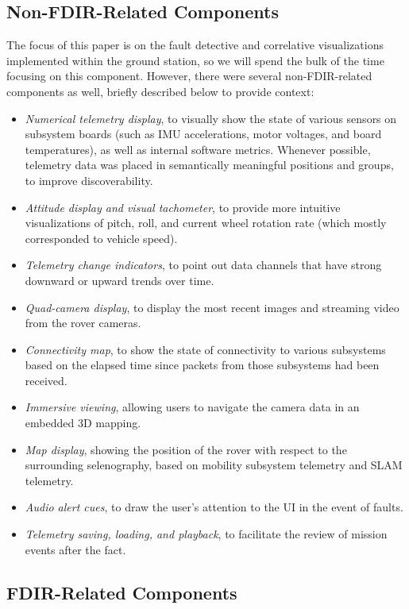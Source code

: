 \subsection{Non-FDIR-Related Components}

The focus of this paper is on the fault detective and correlative visualizations implemented within the ground station, so we will spend the bulk of the time focusing on this component. However, there were several non-FDIR-related components as well, briefly described below to provide context:

\begin{itemize}
    \item \textit{Numerical telemetry display}, to visually show the state of various sensors on subsystem boards (such as IMU accelerations, motor voltages, and board temperatures), as well as internal software metrics. Whenever possible, telemetry data was placed in semantically meaningful positions and groups, to improve discoverability.
    \item \textit{Attitude display and visual tachometer}, to provide more intuitive visualizations of pitch, roll, and current wheel rotation rate (which mostly corresponded to vehicle speed).
    \item \textit{Telemetry change indicators}, to point out data channels that have strong downward or upward trends over time.
    \item \textit{Quad-camera display}, to display the most recent images and streaming video from the rover cameras.
    \item \textit{Connectivity map}, to show the state of connectivity to various subsystems based on the elapsed time since packets from those subsystems had been received.
    \item \textit{Immersive viewing}, allowing users to navigate the camera data in an embedded 3D mapping.
    \item \textit{Map display}, showing the position of the rover with respect to the surrounding selenography, based on mobility subsystem telemetry and SLAM telemetry.
    \item \textit{Audio alert cues}, to draw the user's attention to the UI in the event of faults.
    \item \textit{Telemetry saving, loading, and playback}, to facilitate the review of mission events after the fact.
\end{itemize}

\subsection{FDIR-Related Components}

